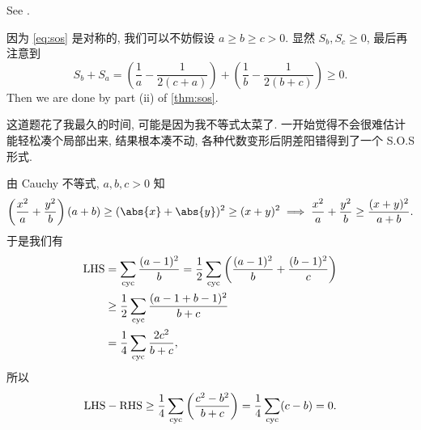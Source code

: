 \begin{soln}
\begin{subproof}
See \cite{sosmethod}.
\end{subproof}

因为 \cref{eq:sos} 是对称的, 我们可以不妨假设 $a \ge b \ge c > 0$.
显然 $S_b, S_c \ge 0$, 最后再注意到
\[
S_b + S_a = \left(\frac{1}{a} - \frac{1}{2(c+a)}\right) +
\left(\frac{1}{b} - \frac{1}{2(b+c)}\right) \ge 0.
\]
Then we are done by part (ii) of \cref{thm:sos}.
\end{soln}

\begin{rem*}
这道题花了我最久的时间, 可能是因为我不等式太菜了.
一开始觉得不会很难估计能轻松凑个局部出来, 结果根本凑不动,
各种代数变形后阴差阳错得到了一个 S.O.S 形式.
\end{rem*}

\begin{soln}
由 Cauchy 不等式, $a, b, c > 0$ 知
\[
\left(\frac{x^2}{a} + \frac{y^2}{b}\right)(a + b)
\ge (\abs{x} + \abs{y})^2 \ge (x + y)^2 \implies
\frac{x^2}{a} + \frac{y^2}{b} \ge \frac{(x + y)^2}{a + b}.
\]
于是我们有
\begin{align*}
\text{LHS} &= \sum_{\mathrm{cyc}} \frac{(a - 1)^2}{b}
            = \frac{1}{2}\sum_{\mathrm{cyc}}\left(\frac{(a - 1)^2}{b} + \frac{(b - 1)^2}{c}\right)\\
           &\ge \frac{1}{2}\sum_{\mathrm{cyc}} \frac{(a - 1 + b - 1)^2}{b + c}\\
           &= \frac{1}{4}\sum_{\mathrm{cyc}} \frac{2c^2}{b + c},
\end{align*}
所以
\[
\text{LHS} - \text{RHS} \ge
\frac{1}{4}\sum_{\mathrm{cyc}}\left(\frac{c^2 - b^2}{b + c}\right)
= \frac{1}{4}\sum_{\mathrm{cyc}} (c - b) = 0.
\]
\end{soln}
